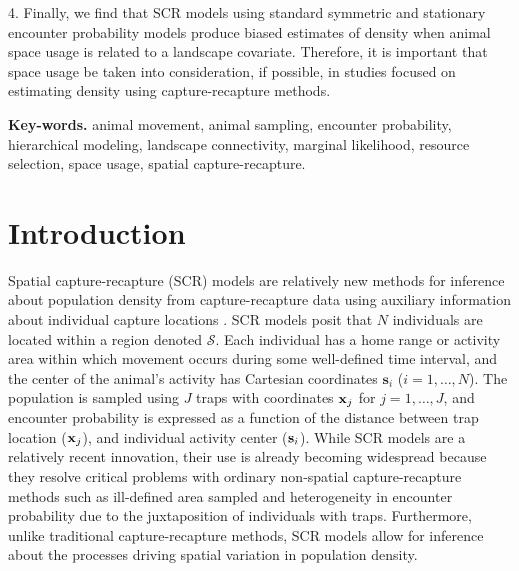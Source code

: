 \documentclass[12pt]{article}
\begin{document}
4. Finally, we find that SCR
models using standard symmetric and stationary encounter probability
models produce biased estimates of density when animal space
usage is related to a landscape covariate. Therefore, it is
important that space usage be taken into consideration, if
possible, in studies focused on estimating density using
capture-recapture methods.

\vspace{.2in}

{\bf Key-words. }
animal movement, animal sampling, encounter
probability, hierarchical modeling, landscape connectivity, marginal likelihood,
resource selection, space usage,  spatial capture-recapture. \\


\section{Introduction}

Spatial capture-recapture (SCR) models are relatively new methods for
inference about population density from capture-recapture data using
auxiliary information about individual capture locations
\citep{efford:2004,borchers_efford:2008, royle_young:2008}.  SCR
models posit that $N$ individuals are located within a region denoted
$\mathcal{S}$. Each individual has a home range or activity area
within which movement occurs during some well-defined time interval,
and the center of the animal's activity has Cartesian coordinates
$\mathbf{s}_i$ ($i=1,\ldots,N$). The population is sampled using $J$
traps with coordinates ${\bf x}_{j}$ for $j=1,\ldots,J$, and encounter
probability is expressed as a function of the distance between trap
location (${\bf x}_{j}$), and individual activity center (${\bf
  s}_{i}$).
While SCR models are a relatively recent innovation, their use is already becoming widespread
\citep{efford_etal:2009ecol, gardner_etal:2010jwm,
  gardner_etal:2010ecol,kery_etal:2010, gopalaswamy_etal:2012,
  foster_harmsen:2012} because they resolve critical problems with
ordinary non-spatial capture-recapture methods such as
ill-defined area sampled and heterogeneity in encounter
probability due to the juxtaposition of individuals with traps. %
Furthermore, unlike traditional capture-recapture methods, SCR models
allow for inference about the processes driving spatial variation in
population density.
\end{document}
